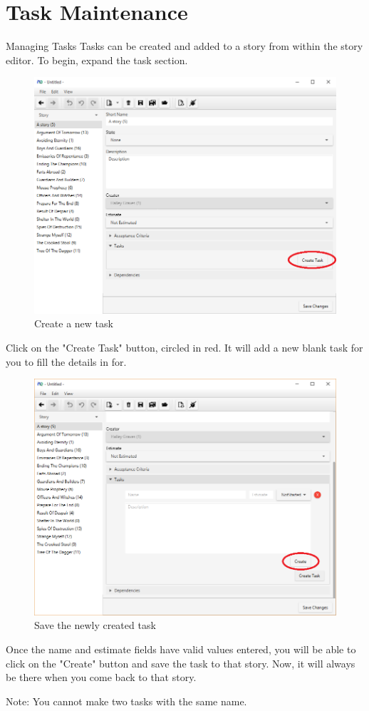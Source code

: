 \section{Task Maintenance}

Managing Tasks
\newline
Tasks can be created and added to a story from within the story editor. To begin, expand the task section.

\begin{figure}[H]
\centering
\includegraphics[width=\textwidth]{images/screenshots/task_1.png}
\caption{Create a new task}
\label{fig:new_project}
\end{figure}

Click on the "Create Task" button, circled in red. It will add a new blank task for you to fill the details in for.

\begin{figure}[H]
\centering
\includegraphics[width=\textwidth]{images/screenshots/task_2.png}
\caption{Save the newly created task}
\label{fig:new_project}
\end{figure}

Once the name and estimate fields have valid values entered, you will be able to click on the "Create" button and save the task to that story. Now, it will always be there when you come back to that story.


Note:
\newline
You cannot make two tasks with the same name.